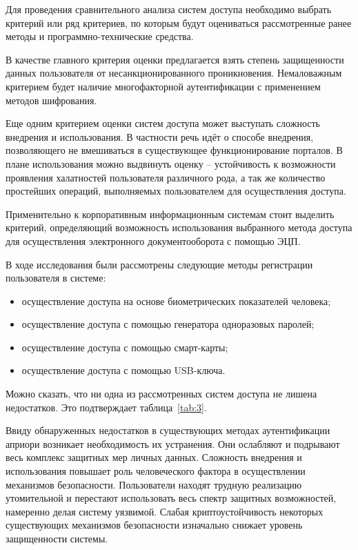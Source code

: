 Для проведения сравнительного анализа систем доступа необходимо выбрать критерий
или ряд критериев, по которым будут оцениваться рассмотренные ранее методы и
программно-технические средства.

В качестве главного критерия оценки предлагается взять степень защищенности
данных пользователя от несанкционированного проникновения. Немаловажным
критерием будет наличие многофакторной аутентификации с применением методов
шифрования.

Еще одним критерием оценки систем доступа может выступать сложность внедрения и
использования. В частности речь идёт о способе внедрения, позволяющего не
вмешиваться в существующее функционирование порталов. В плане использования
можно выдвинуть оценку -- устойчивость к возможности проявления халатностей
пользователя различного рода, а так же количество простейших операций,
выполняемых пользователем для осуществления доступа.

Применительно к корпоративным информационным системам стоит выделить критерий,
определяющий возможность использования выбранного метода доступа для
осуществления электронного документооборота с помощью ЭЦП.

В ходе исследования были рассмотрены следующие методы регистрации пользователя в
системе:
\begin{itemize}
  \item осуществление доступа на основе биометрических показателей человека;
  \item осуществление доступа с помощью генератора одноразовых паролей;
  \item осуществление доступа с помощью смарт-карты;
  \item осуществление доступа с помощью USB-ключа.
\end{itemize}

Можно сказать, что ни одна из рассмотренных систем доступа не лишена
недостатков. Это подтверждает таблица~\ref{tab:3}.



Ввиду обнаруженных недостатков в существующих методах аутентификации априори
возникает необходимость их устранения. Они ослабляют и подрывают весь комплекс
защитных мер личных данных. Сложность внедрения и использования повышает роль
человеческого фактора в осуществлении механизмов безопасности. Пользователи
находят трудную реализацию утомительной и перестают использовать весь спектр
защитных возможностей, намеренно делая систему уязвимой. Слабая
криптоустойчивость некоторых существующих механизмов безопасности изначально
снижает уровень защищенности системы.
